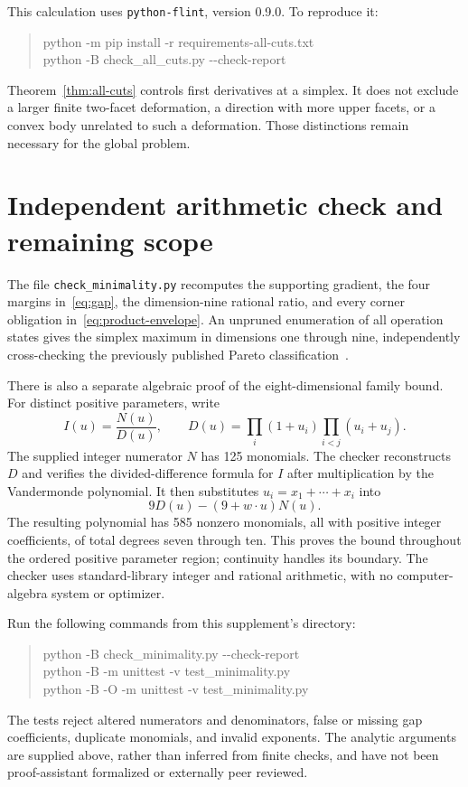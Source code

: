 \documentclass[11pt,a4paper]{article}
\begin{document}
This calculation uses \texttt{python-flint}, version 0.9.0.
To reproduce it:
\begin{quote}\small\ttfamily
python -m pip install -r requirements-all-cuts.txt\\
python -B check\_all\_cuts.py -{}-check-report
\end{quote}
Theorem~\ref{thm:all-cuts} controls first derivatives at a simplex.
It does not exclude a larger finite two-facet deformation, a direction
with more upper facets, or a convex body unrelated to such a deformation.
Those distinctions remain necessary for the global problem.

\section{Independent arithmetic check and remaining scope}
The file \texttt{check\_minimality.py} recomputes the supporting gradient,
the four margins in~\eqref{eq:gap}, the dimension-nine rational ratio,
and every corner obligation in~\eqref{eq:product-envelope}.
An unpruned enumeration of all operation states gives the simplex
maximum in dimensions one through nine, independently cross-checking
the previously published Pareto classification~\cite{finite}.

There is also a separate algebraic proof of the eight-dimensional family
bound. For distinct positive parameters, write
\[
 I(u)=\frac{N(u)}{D(u)},\qquad
 D(u)=\prod_i(1+u_i)\prod_{i<j}(u_i+u_j).
\]
The supplied integer numerator $N$ has 125 monomials. The checker
reconstructs $D$ and verifies the divided-difference formula for $I$
after multiplication by the Vandermonde polynomial. It then substitutes
$u_i=x_1+\cdots+x_i$ into
\[
 9D(u)-(9+w\cdot u)N(u).
\]
The resulting polynomial has 585 nonzero monomials, all with positive
integer coefficients, of total degrees seven through ten. This proves
the bound throughout the ordered positive parameter region; continuity
handles its boundary. The checker uses standard-library integer and
rational arithmetic, with no computer-algebra system or optimizer.

Run the following commands from this supplement's directory:
\begin{quote}\small\ttfamily
python -B check\_minimality.py -{}-check-report\\
python -B -m unittest -v test\_minimality.py\\
python -B -O -m unittest -v test\_minimality.py
\end{quote}
The tests reject altered numerators and denominators, false or missing
gap coefficients, duplicate monomials, and invalid exponents. The
analytic arguments are supplied above, rather than inferred from finite
checks, and have not been proof-assistant formalized or externally
peer reviewed.
\end{document}
